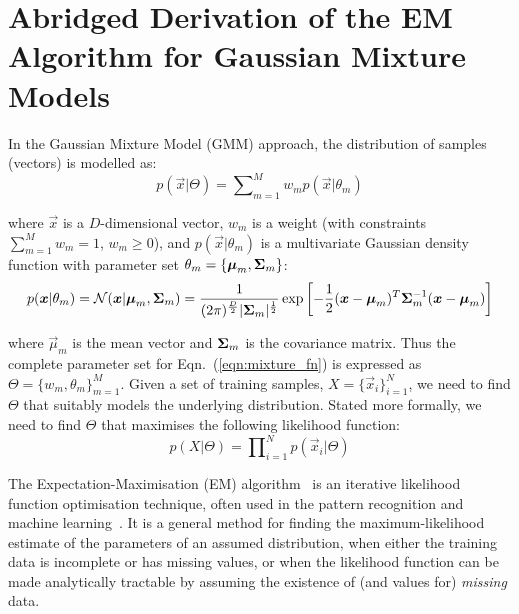 \section{Abridged Derivation of the EM Algorithm for Gaussian Mixture Models}
\label{app:em_algorithm}

In the Gaussian Mixture Model (GMM) approach, the distribution of samples (vectors) is modelled as:
%
\begin{equation}
	p(\Vec{x} | \Theta) = \sum\nolimits_{m=1}^{M} w_m p(\Vec{x}| \theta_m)
	\label{eqn:mixture_fn}
\end{equation}

\noindent
where $\Vec{x}$ is a $D$-dimensional vector,
$w_m$ is a weight (with constraints $\sum\nolimits_{m=1}^{M} w_m = 1$, $w_m \geq 0$),
and
$p(\Vec{x}| \theta_m)$ is a multivariate Gaussian density function with parameter set $\theta_m = \{ {\boldsymbol{\mu}}_m, {\boldsymbol{\Sigma}}_m \}$:
%
\begin{equation}
	p(\Vec{x}| \theta_m) =  {{\mathcal{N}}}( \Vec{x} | \Vec{\mu}_m, \Mat{\Sigma}_m )  = 
		\frac{1}{ (2\pi)^{\frac{D}{2}} | \Mat{\Sigma}_m|^{\frac{1}{2}} }
		\exp \left[ -\frac{1}{2} (\Vec{x}-\Vec{\mu}_m)^T \Mat{\Sigma}_m^{-1} (\Vec{x}-\Vec{\mu}_m) \right]
%
\end{equation}%

\noindent
where $\Vec{\mu}_m$ is the mean vector and ${\boldsymbol{\Sigma}}_m$ is the covariance matrix.
Thus the complete parameter set for Eqn.~(\ref{eqn:mixture_fn}) is expressed as $\Theta = \{w_m, \theta_m\}_{m=1}^{M}$.
Given a set of training samples, $X=\{\Vec{x}_i\}_{i=1}^{N}$,
we need to find $\Theta$ that suitably models the underlying distribution.
Stated more formally, we need to find $\Theta$ that maximises the following likelihood function:
%
\begin{equation}
	p(X | \Theta) = \prod\nolimits_{i=1}^{N} p(\Vec{x}_i | \Theta)
	\label{eqn:lhood_fn}
\end{equation}

The Expectation-Maximisation (EM) algorithm~\cite{Dempster77, McLachlan-2008, Moon96, Redner84} is an iterative likelihood function optimisation technique,
often used in the pattern recognition and machine learning~\cite{Duda01}.
It is a general method for finding the maximum-likelihood estimate of the parameters of an assumed distribution,
when either the training data is incomplete or has missing values, or when the likelihood function can be made analytically tractable
by assuming the existence of (and values for) {\it missing} data.

